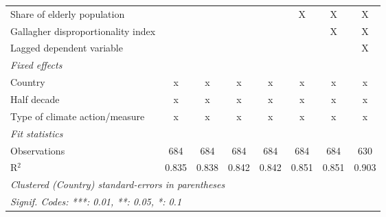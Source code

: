 \begin{tabular}{lccccccc}
   Share of elderly population                                           &                &                &                &                & X              & X              & X\\  
   Gallagher disproportionality index                                    &                &                &                &                &                & X              & X\\  
   Lagged dependent variable                                             &                &                &                &                &                &                & X\\  
   \emph{Fixed effects}\\
   Country                                                               & x              & x              & x              & x              & x              & x              & x\\  
   Half decade                                                           & x              & x              & x              & x              & x              & x              & x\\  
   Type of climate action/measure                                        & x              & x              & x              & x              & x              & x              & x\\  
   \midrule \emph{Fit statistics}\\
   Observations                                                          & 684            & 684            & 684            & 684            & 684            & 684            & 630\\  
   R$^2$                                                                 & 0.835          & 0.838          & 0.842          & 0.842          & 0.851          & 0.851          & 0.903\\  
   \midrule
   \multicolumn{8}{l}{\emph{Clustered (Country) standard-errors in parentheses}}\\
   \multicolumn{8}{l}{\emph{Signif. Codes: ***: 0.01, **: 0.05, *: 0.1}}\\
\end{tabular}
\par\endgroup


